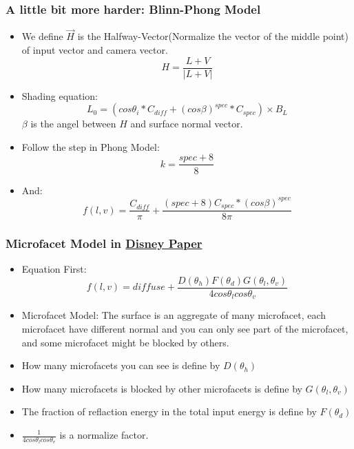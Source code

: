 \documentclass[cyan,normal,en]{elegantnote}
\begin{document}
\subsubsection{A little bit more harder: Blinn-Phong Model}
\begin{itemize}
	\item We define $\vec{H}$ is the Halfway-Vector(Normalize the vector of the middle point) of input vector and camera vector.
	$$H=\frac{L+V}{|L+V|}$$ 
	\item Shading equation:
	$$L_0=(cos\theta_i * C_{diff} + (cos\beta)^{spec}*C_{spec})\times B_L$$
	$\beta$ is the angel between $H$ and surface normal vector.
	\item Follow the step in Phong Model:
	$$k=\frac{spec+8}{8}$$
	\item And:
	$$f(l,v)=\frac{C_{diff}}{\pi} + \frac{(spec+8)C_{spec}*(cos\beta)^{spec}}{8\pi}$$
\end{itemize}
\subsubsection{Microfacet Model in \href{https://disney-animation.s3.amazonaws.com/library/s2012_pbs_disney_brdf_notes_v2.pdf}{Disney Paper}}
\begin{itemize}
	\item Equation First:
	$$f(l,v)=diffuse + \frac{D(\theta_h)F(\theta_d)G(\theta_l,\theta_v)}{4cos\theta_l cos\theta_v}$$
	\item Microfacet Model: The surface is an aggregate of many microfacet, each microfacet have different normal and you can only see part of the microfacet, and some microfacet might be blocked by others.
	\item How many microfacets you can see is define by $D(\theta_h)$
	\item How many microfacets is blocked by other microfacets is define by $G(\theta_l,\theta_v)$
	\item The fraction of reflaction energy in the total input energy is define by $F(\theta_d)$ 
	\item $\frac{1}{4cos\theta_l cos\theta_v}$ is a normalize factor. 
\end{itemize}
\end{document}
